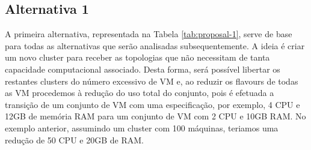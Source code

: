 \subsection{Alternativa 1}

A primeira alternativa, representada na Tabela \ref{tab:proposal-1}, serve de base para todas as
alternativas que serão analisadas subsequentemente. A ideia é criar um novo \gls{cluster}
para receber as topologias que não necessitam de tanta capacidade computacional associado. Desta 
forma, será possível libertar os restantes \glspl{cluster} do número excessivo de \ac{VM} 
e, ao reduzir os \glspl{flavour} de todas as \ac{VM} procedemos à redução do uso total do
conjunto, pois é efetuada a transição de um conjunto de \ac{VM} com uma especificação, por exemplo,
4 \ac{CPU} e 12GB de memória RAM para um conjunto de \ac{VM} com 2 \ac{CPU} e 10GB RAM. No exemplo
anterior, assumindo um \gls{cluster} com 100 máquinas, teriamos uma redução de 50 \ac{CPU} e 20GB 
de RAM.

